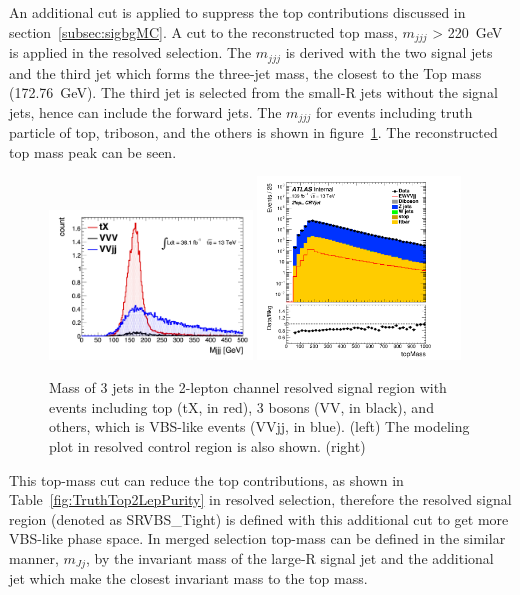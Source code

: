 An additional cut is applied to suppress the top contributions discussed in section~\ref{subsec:sigbgMC}. A cut to the reconstructed top mass, $m_{jjj}$ > 220~GeV is applied in the resolved selection. 
The $m_{jjj}$ is derived with the two signal jets and the third jet which forms the three-jet mass, the closest to the Top mass (172.76~GeV). 
The third jet is selected from the small-R jets without the signal jets, hence can include the forward jets.
The $m_{jjj}$ for events including truth particle of top, triboson, and the others is shown in figure~\ref{fig:2leptopMass}. The reconstructed top mass peak can be seen.
\begin{figure}[H]
    \begin{center}
      \includegraphics[width=0.48\textwidth]{figures/2lep/topMass/WZjjtopMasspeak}
      \includegraphics[width=0.48\textwidth]{figures/2lep/dataMC/C_0ptag2pjet_0ptv_CRVjet_topMass_Log}
        \caption{ Mass of 3 jets in the 2-lepton channel resolved signal region with events including top (tX, in red), 3 bosons (VV, in black), and others, which is VBS-like events (VVjj, in blue). (left) The modeling plot in resolved control region is also shown. (right)}
        \label{fig:2leptopMass}
    \end{center}
\end{figure}
This top-mass cut can reduce the top contributions, as shown in Table~\ref{fig:TruthTop2LepPurity} in resolved selection, therefore the resolved signal region (denoted as SRVBS\_Tight) is defined with this additional cut to get more VBS-like phase space. In merged selection top-mass can be defined in the similar manner, $m_{Jj}$, by the invariant mass of the large-R signal jet and the additional jet which make the closest invariant mass to the top mass. 
